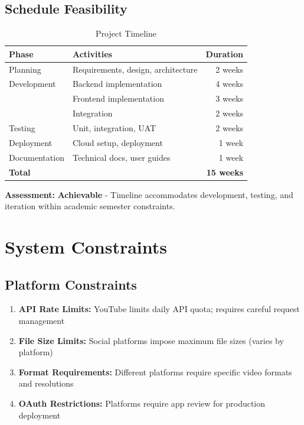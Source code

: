 \subsection{Schedule Feasibility}

\begin{table}[H]
\centering
\caption{Project Timeline}
\begin{tabular}{@{}llr@{}}
\toprule
\textbf{Phase} & \textbf{Activities} & \textbf{Duration} \\
\midrule
Planning & Requirements, design, architecture & 2 weeks \\
Development & Backend implementation & 4 weeks \\
 & Frontend implementation & 3 weeks \\
 & Integration & 2 weeks \\
Testing & Unit, integration, UAT & 2 weeks \\
Deployment & Cloud setup, deployment & 1 week \\
Documentation & Technical docs, user guides & 1 week \\
\midrule
\textbf{Total} & & \textbf{15 weeks} \\
\bottomrule
\end{tabular}
\end{table}

\textbf{Assessment:} \textbf{Achievable} - Timeline accommodates development, testing, and iteration within academic semester constraints.

\section{System Constraints}

\subsection{Platform Constraints}

\begin{enumerate}
    \item \textbf{API Rate Limits:} YouTube limits daily API quota; requires careful request management
    \item \textbf{File Size Limits:} Social platforms impose maximum file sizes (varies by platform)
    \item \textbf{Format Requirements:} Different platforms require specific video formats and resolutions
    \item \textbf{OAuth Restrictions:} Platforms require app review for production deployment
\end{enumerate}

